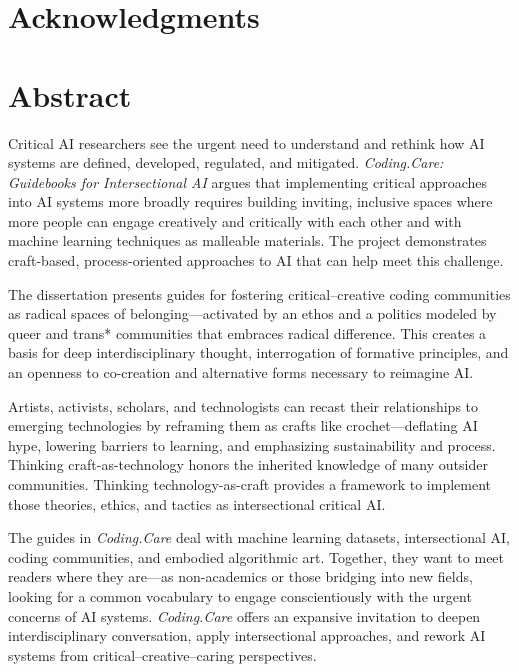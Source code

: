 \documentclass[11pt,oneside]{scrbook} %
\begin{document}
\newpage
\chapter*{Acknowledgments}
% 

\newpage
\renewcommand{\contentsname}{Table of Contents}
        \tableofcontents
        \listoffigures

\newpage
% 
\chapter*{Abstract}

Critical AI researchers see the urgent need to understand and rethink how AI systems are defined, developed, regulated, and mitigated. \emph{Coding.Care: Guidebooks for Intersectional AI} argues that implementing critical approaches into AI systems more broadly requires building inviting, inclusive spaces where more people can engage creatively and critically with each other and with machine learning techniques as malleable materials. The project demonstrates craft-based, process-oriented approaches to AI that can help meet this challenge. 

The dissertation presents guides for fostering critical–creative coding communities as radical spaces of belonging—activated by an ethos and a politics modeled by queer and trans* communities that embraces radical difference. This creates a basis for deep interdisciplinary thought, interrogation of formative principles, and an openness to co-creation and alternative forms necessary to reimagine AI. 

Artists, activists, scholars, and technologists can recast their relationships to emerging technologies by reframing them as crafts like crochet—deflating AI hype, lowering barriers to learning, and emphasizing sustainability and process. Thinking craft-as-technology honors the inherited knowledge of many outsider communities. Thinking technology-as-craft provides a framework to implement those theories, ethics, and tactics as intersectional critical AI. 

The guides in \emph{Coding.Care} deal with machine learning datasets, intersectional AI, coding communities, and embodied algorithmic art. Together, they want to meet readers where they are—as non-academics or those bridging into new fields, looking for a common vocabulary to engage conscientiously with the urgent concerns of AI systems. \emph{Coding.Care} offers an expansive invitation to deepen interdisciplinary conversation, apply intersectional approaches, and rework AI systems from critical–creative–caring perspectives.
\end{document}

